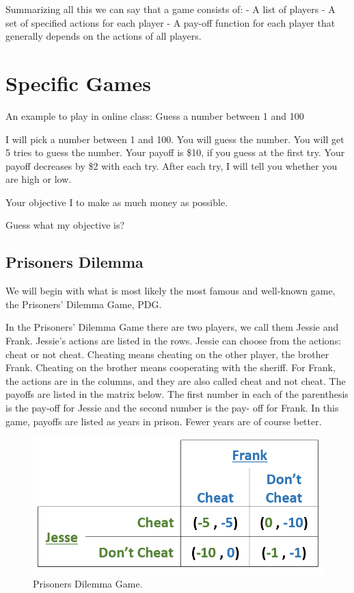\documentclass[
]{book}
\begin{document}
Summarizing all this we can say that a game consists of:
- A list of players
- A set of specified actions for each player
- A pay-off function for each player that generally depends on the actions of all players.

\hypertarget{specific-games}{%
\section{Specific Games}\label{specific-games}}

An example to play in online class: Guess a number between 1 and 100

I will pick a number between 1 and 100. You will guess the number. You will get 5 tries to guess the number. Your payoff is \$10, if you guess at the first try. Your payoff decreases by \$2 with each try. After each try, I will tell you whether you are high or low.

Your objective I to make as much money as possible.

Guess what my objective is?

\hypertarget{prisoners-dilemma}{%
\subsection{Prisoners Dilemma}\label{prisoners-dilemma}}

We will begin with what is most likely the most famous and well-known game, the
Prisoners' Dilemma Game, PDG.

In the Prisoners' Dilemma Game there are two players, we call them Jessie and Frank. Jessie's actions are listed in the rows. Jessie can choose from the actions: cheat or not cheat. Cheating means cheating on the other player, the brother Frank. Cheating on the brother means cooperating with the sheriff. For Frank, the actions are in the columns, and they are also called cheat and not cheat. The payoffs are listed in the matrix below. The first number in each of the parenthesis is the pay-off for Jessie and the second number is the pay- off for Frank. In this game, payoffs are listed as years in prison. Fewer years are of course better.

\begin{figure}

{\centering \includegraphics[width=0.5\linewidth]{img/gametheory/fig1} 

}

\caption{Prisoners Dilemma Game.}\label{fig:gametheory01}
\end{figure}
\end{document}
